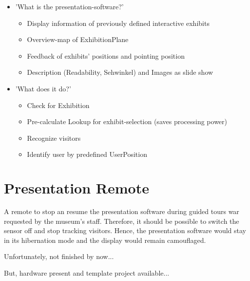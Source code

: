 \begin{itemize}
	\item 'What is the presentation-software?'
	\begin{itemize}
		\item Display information of previously defined interactive exhibits
		\item Overview-map of ExhibitionPlane
		\item Feedback of exhibits' positions and pointing position
		\item Description (Readability, Sehwinkel) and Images as slide show
	\end{itemize}
	\item 'What does it do?'
	\begin{itemize}
		\item Check for Exhibition
		\item Pre-calculate Lookup for exhibit-selection (saves processing power)
		\item Recognize visitors
		\item Identify user by predefined UserPosition 
	\end{itemize}
\end{itemize}


\section{Presentation Remote}
\label{implementation_remote}

A remote to stop an resume the presentation software during guided tours war requested by the museum's staff. Therefore, it should be possible to switch the sensor off and stop tracking visitors. Hence, the presentation software would stay in its hibernation mode and the display would remain camouflaged.

Unfortunately, not finished by now...

But, hardware present and template project available...

%

